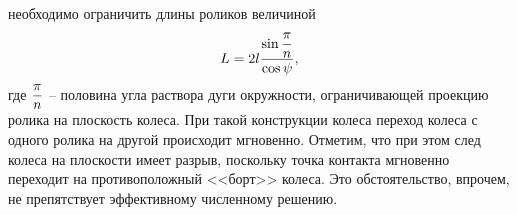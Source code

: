 необходимо ограничить длины роликов величиной
$$
L=2l\displaystyle\frac{\displaystyle \sin\displaystyle\frac{\displaystyle \pi}{\displaystyle n}}{\displaystyle \cos\psi},
$$
где $\displaystyle\frac{\displaystyle \pi}{\displaystyle n}$ -- половина угла раствора дуги окружности, ограничивающей проекцию ролика на плоскость колеса. При такой конструкции колеса переход колеса с одного ролика на другой происходит мгновенно.
Отметим, что при этом след колеса на плоскости имеет разрыв, поскольку точка контакта мгновенно переходит на противоположный <<борт>> колеса. Это обстоятельство, впрочем, не препятствует эффективному численному решению.

